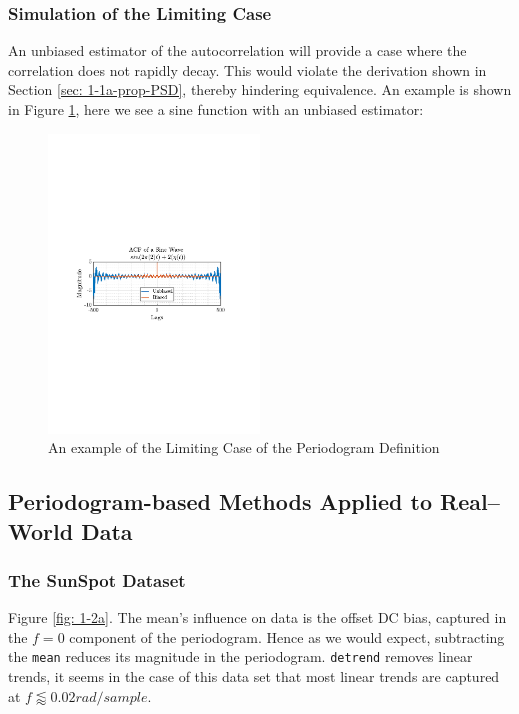 \documentclass[12pt]{article}
\numberwithin{equation}{section}
\begin{document}
	\subsubsection{Simulation of the Limiting Case} \label{sec: 1-1b-prop-PSD}
	
	An unbiased estimator of the autocorrelation will provide a case where the correlation does not rapidly decay. This would violate the derivation shown in Section \ref{sec: 1-1a-prop-PSD}, thereby hindering equivalence.
	An example is shown in Figure \ref{fig: 1-1b}, here we see a sine function with an unbiased estimator:
	
	\begin{figure}[H]
		\centering
		\includegraphics[trim={2.2cm 11.2cm 3.15cm  11.2cm}, clip, width=0.5\textwidth]{../MATLAB/figures/q1_1b_fig01.pdf} 
		\captionsetup{justification=centering}
		\caption{An example of the Limiting Case of the Periodogram Definition}
		\label{fig: 1-1b}
	\end{figure}
	
	
	\subsection{Periodogram-based Methods Applied to Real–World Data} \label{sec: 1-2-PSD-real-world}
	\subsubsection{The SunSpot Dataset}
	Figure \ref{fig: 1-2a}. The mean's influence on data is the offset DC bias, captured in the $f=0$ component of the periodogram. Hence as we would expect, subtracting the \texttt{mean} reduces its magnitude in the periodogram. \texttt{detrend} removes linear trends, it seems in the case of this data set that most linear trends are captured at $f \lessapprox 0.02 rad/sample$. \\
	
\end{document}
